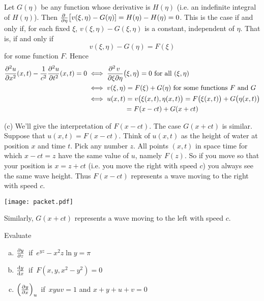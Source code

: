 \begin{solution}
Let $G(\eta)$ be any function whose derivative is $H(\eta)$
(i.e. an indefinite integral of $H(\eta)$). Then 
$\pdiff{}{\eta}\big[v(\xi,\eta)-G(\eta)]=H(\eta)-H(\eta)=0$. 
This is the case if and only if, for each fixed $\xi$, 
$v(\xi,\eta)-G(\xi,\eta)$  is a constant, independent of $\eta$. That is, 
if and  only if 
\begin{equation*}
v(\xi,\eta)-G(\eta)=F(\xi)
\end{equation*}  
for some function $F$. Hence
\begin{align*}
\frac{\partial^2 u}{\partial x^2}(x,t)
-\frac{1}{c^2}\frac{\partial^2 u}{\partial t^2}(x,t)=0
&\iff
\frac{\partial^2\hfil v\hfil\,}{\partial\xi\partial\eta}
      \big(\xi,\eta\big)=0\text{ for all }(\xi,\eta)\\
&\iff v(\xi,\eta)=F(\xi)+G(\eta)\text{ for some functions $F$ and $G$}\\
&\iff u(x,t)=v\big(\xi(x,t),\eta(x,t)\big)
=F\big(\xi(x,t)\big)+G\big(\eta(x,t)\big)\\
&\phantom{\iff u(x,t)\,}=F(x-ct)+G(x+ct)
\end{align*}

(c)
We'll give the interpretation of $F(x-ct)$. The case $G(x+ct)$ is similar.
Suppose that $u(x,t)=F(x-ct)$. Think of $u(x,t)$ as the height of water
at position $x$ and time $t$. Pick any number $z$. All points $(x,t)$
in space time for which $x-ct=z$ have the same value of $u$, namely $F(z)$.
So if you move so that your position is $x=z+ct$ (i.e. you move the right 
with speed $c$) you always see the same wave height. Thus $F(x-ct)$
represents a wave moving to the right with speed $c$. 
\begin{center}
   \texttt{[image: packet.pdf]}
\end{center}
Similarly, $G(x+ct)$ represents a wave moving to the left with speed $c$.

\end{solution}

\begin{question}
 Evaluate 
\begin{enumerate}[(a)]
\item
$\pdiff{y}{z}$\ if\ $e^{yz}-x^2 z \ln y = \pi$
\item
$\diff{y}{x}$\ if\ $F(x,y,x^2-y^2)=0$
\item
$\left(\pdiff{y}{x}\right)_u$\ if\
$xyuv=1$ and $x+y+u+v=0$ 
\end{enumerate}
\end{question}

